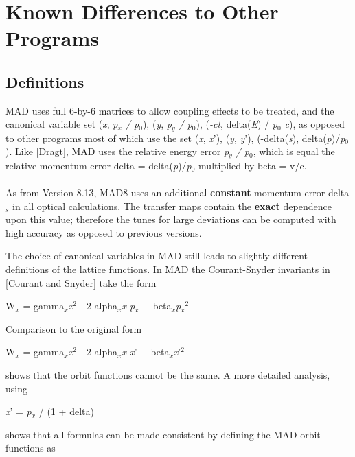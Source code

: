 
\chapter{Known Differences to Other Programs}

\section{Definitions}
\label{sec:definitions}

MAD uses full 6-by-6 matrices to allow coupling effects to be treated,
and the canonical variable set (\textit{x}, \textit{p$_x$ / p$_0$}),
(\textit{y}, \textit{p$_y$ / p$_0$}), (\textit{-ct}, delta(\textit{E}) /
\textit{p$_0$ c}), as opposed to other programs most of which use the
set (\textit{x}, \textit{x}'), (\textit{y}, \textit{y}'),
(-delta(\textit{s}), delta(\textit{p})/\textit{p$_0$}). Like
\href{bibliography.html#dragt}{[Dragt]}, MAD uses the relative energy
error \textit{p$_y$ / p$_0$}, which is equal the relative momentum error
delta = delta(\textit{p})/\textit{p$_0$} multiplied by beta = v/c.  
\\ \\ 
As from Version 8.13, MAD8 uses an additional \textbf{constant} momentum
error delta$_\textit{s}$ in all optical calculations. The transfer maps
contain the \textbf{exact} dependence upon this value; therefore the
tunes for large deviations can be computed with high accuracy as opposed
to previous versions.  

 
The choice of canonical variables in MAD still leads to slightly
different definitions of the lattice functions. In MAD the
Courant-Snyder invariants in \href{bibliography.html#courant}{[Courant
    and Snyder]} take the form  

W$_x$ = gamma$_\textit{x}$\textit{x}$^2$ - 2 alpha$_\textit{x}$\textit{x
  p$_x$} + beta$_\textit{x}$\textit{p$_x$}$^2$ 

Comparison to the original form 

 W$_x$ = gamma$_\textit{x}$\textit{x}$^2$ - 2
 alpha$_\textit{x}$\textit{x x}' + beta$_\textit{x}$\textit{x}'$^2$ 

shows that the orbit functions cannot be the same. A more detailed analysis, using 

\textit{x}' = \textit{p$_x$} / (1 + delta) 

shows that all formulas can be made consistent by defining the MAD orbit
functions as  
 
